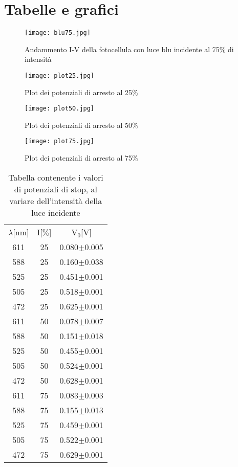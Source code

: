 \documentclass{article}
\begin{document}
\section{Tabelle e grafici}
\begin{figure}[h!]
    \centering
    \texttt{[image: blu75.jpg]}
    \caption{Andammento I-V della fotocellula con luce blu incidente al 75$\%$ di intensità}
    \label{figura1}
\end{figure}
\begin{figure}[h!]
    \centering
    \texttt{[image: plot25.jpg]}
    \caption{Plot dei potenziali di arresto al 25$\%$}
    \label{figura1}
\end{figure}
\begin{figure}[h!]
    \centering
    \texttt{[image: plot50.jpg]}
    \caption{Plot dei potenziali di arresto al 50$\%$}
    \label{figura1}
\end{figure}
\begin{figure}[h!]
    \centering
    \texttt{[image: plot75.jpg]}
    \caption{Plot dei potenziali di arresto al 75$\%$}
    \label{figura1}
\end{figure}
\begin{table}[h!]
  \begin{center}
   \begin{tabular}{|c|c|c|}
      $\lambda$[nm]&I[$\%$]&V$_{0}$[V]\\
      611&25&0.080$\pm$0.005\\
      588&25&0.160$\pm$0.038\\
      525&25&0.451$\pm$0.001\\
      505&25&0.518$\pm$0.001\\
      472&25&0.625$\pm$0.001\\
      611&50&0.078$\pm$0.007\\
      588&50&0.151$\pm$0.018\\
      525&50&0.455$\pm$0.001\\
      505&50&0.524$\pm$0.001\\
      472&50&0.628$\pm$0.001\\
      611&75&0.083$\pm$0.003\\
      588&75&0.155$\pm$0.013\\
      525&75&0.459$\pm$0.001\\
      505&75&0.522$\pm$0.001\\
      472&75&0.629$\pm$0.001\\
   \end{tabular}
   \caption{Tabella contenente i valori di potenziali di stop, al variare dell'intensità della luce incidente}
  \end{center}
\end{table}
\end{document}

